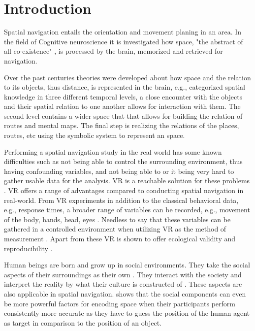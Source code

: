 \chapter{Introduction}

Spatial navigation entails the orientation and movement planing in an area. In the field of Cognitive neuroscience it is investigated how space, "the abstract of all co-existence" \autocite{spencer1989}, is processed by the brain, memorized and retrieved for navigation. 

Over the past centuries theories were developed about how space and the relation to its objects, thus distance, is represented in the brain, e.g., \textcite{cassirer1955philosophy} categorized spatial knowledge in three different temporal levels, a close encounter with the objects and their spatial relation to one another allows for interaction with them. The second level contains a wider space that that allows for building the relation of routes and mental maps. The final step is realizing the relations of the places, routes, etc using the symbolic system to represent an space. 

Performing a spatial navigation study in the real world has some known difficulties such as not being able to control the surrounding environment, thus having confounding variables, and not being able to or it being very hard to gather usable data for the analysis. VR is a reachable solution for these problems \autocite{diersch2019potential}. VR offers a range of advantages compared to conducting spatial navigation in real-world. From VR experiments in addition to the classical behavioral data, e.g., response times, a broader range of variables can be recorded, e.g., movement of the body, hands, head, eyes \autocite{pan2018and}. Needless to say that these variables can be gathered in a controlled environment when utilizing VR as the method of measurement \autocite{mcilvenny2020future}. Apart from these VR is shown to offer ecological validity \autocite{pan2018and, chicchi2017novel} and reproducibility \autocite{pan2018and}.

Human beings are born and grow up in social environments. They take the social aspects of their surroundings as their own \autocite{berger1967luckman}. They interact with the society and interpret the reality by what their culture is constructed of \autocite{SIEGEL19759}. These aspects are also applicable in spatial navigation. \textcite{kuehn2018social} shows that the social components can even be more powerful factors for encoding space when their participants perform consistently more accurate as they have to guess the position of the human agent as target in comparison to the position of an object.

